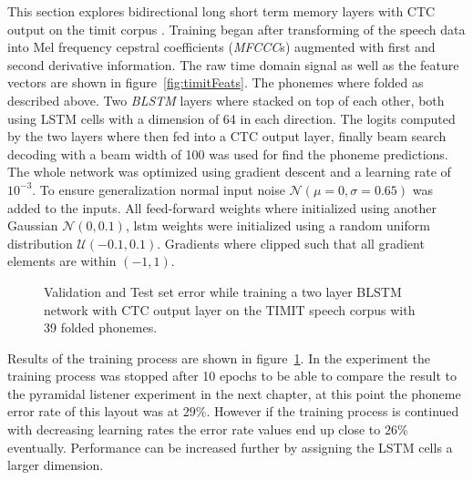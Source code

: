 This section explores bidirectional long short term memory layers with CTC output on the timit corpus \cite{Graves2012, Graves2006}. Training began after transforming of the speech data into Mel frequency cepstral coefficients (\textit{MFCCC}s) augmented with first and second derivative information. The raw time domain signal as well as the feature vectors are shown in figure~\ref{fig:timitFeats}. The phonemes where folded as described above. Two \textit{BLSTM} layers where stacked on top of each other, both using LSTM cells with a dimension of 64 in each direction. The logits computed by the two layers where then fed into a CTC output layer, finally beam search decoding with a beam width of 100 was used for find the phoneme predictions. The whole network was optimized using gradient descent and a learning rate of $10^{-3}$. To ensure generalization normal input noise $\mathcal{N}(\mu = 0,\sigma = 0.65)$ was added to the inputs. All feed-forward weights where initialized using another Gaussian $\mathcal{N}(0, 0.1)$, lstm weights were initialized using a random uniform distribution $\mathcal{U}(-0.1, 0.1)$. Gradients where clipped such that all gradient elements are within $(-1,1)$.
\begin{figure}
\centering


\caption{Validation and Test set error while training a two layer BLSTM network with CTC output layer on the TIMIT speech corpus with 39 folded phonemes.}
\label{fig:ctc2BLSTM41}
\end{figure}
Results of the training process are shown in figure~\ref*{fig:ctc2BLSTM41}. In the experiment the training process was stopped after 10 epochs to be able to compare the result to the pyramidal listener experiment in the next chapter, at this point the phoneme error rate of this layout was at $29\%$. However if the training process is continued with decreasing learning rates the error rate values end up close to $26\%$ eventually. Performance can be increased further by assigning the LSTM cells a larger dimension.

